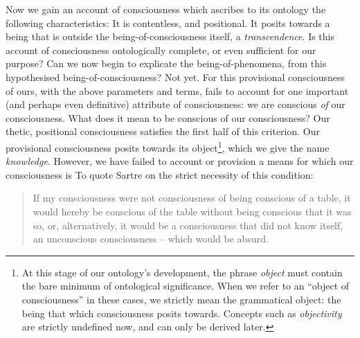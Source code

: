 Now we gain an account of consciousness which ascribes to its ontology the following characteristics: It is contentless, and positional. It posits towards a being that is outside the being-of-consciousness itself, a \emph{transcendence}. Is this account of consciousness ontologically complete, or even sufficient for our purpose? Can we now begin to explicate the being-of-phenomena, from this hypothesised being-of-consciousness? Not yet. For this provisional consciousness of ours, with the above parameters and terms, fails to account for one important (and perhaps even definitive) attribute of consciousness: we are conscious \emph{of} our consciousness. What does it mean to be conscious of our consciousness?  Our thetic, positional consciousness satisfies the first half of this criterion. Our provisional consciousness posits towards its object\footnote{At this stage of our ontology's development, the phrase \emph{object} must contain the bare minimum of ontological significance. When we refer to an \enquote{object of consciousness} in these cases, we strictly mean the grammatical object: the being that which consciousness posits towards. Concepts such as \emph{objectivity} are strictly undefined now, and can only be derived later.}, which we give the name \emph{knowledge}. However, we have failed to account or provision a means for which our consciousness is  To quote Sartre on the strict necessity of this condition:

\blockcquote[10]{Sartre}{%
    If my consciousness were not consciousness of being conscious of a table, it would hereby be conscious of the table without being conscious that it was so, or, alternatively, it would be a consciousness that did not know itself, an unconscious consciousness -- which would be absurd.
}

